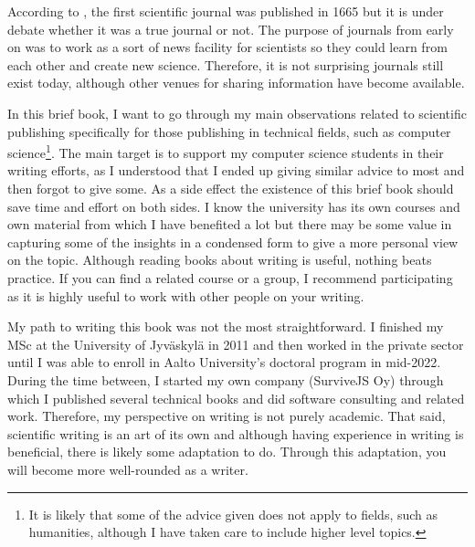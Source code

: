 


According to \citet{openWhatFirst}, the first scientific journal was published in 1665 but it is under debate whether it was a true journal or not.
The purpose of journals from early on was to work as a sort of news facility for scientists so they could learn from each other and create new science.
Therefore, it is not surprising journals still exist today, although other venues for sharing information have become available.

In this brief book, I want to go through my main observations related to scientific publishing specifically for those publishing in technical fields, such as computer science\footnote{It is likely that some of the advice given does not apply to fields, such as humanities, although I have taken care to include higher level topics.}.
The main target is to support my computer science students in their writing efforts, as I understood that I ended up giving similar advice to most and then forgot to give some.
As a side effect the existence of this brief book should save time and effort on both sides.
I know the university has its own courses and own material from which I have benefited a lot but there may be some value in capturing some of the insights in a condensed form to give a more personal view on the topic.
Although reading books about writing is useful, nothing beats practice.
If you can find a related course or a group, I recommend participating as it is highly useful to work with other people on your writing.

My path to writing this book was not the most straightforward.
I finished my MSc at the University of Jyväskylä in 2011 and then worked in the private sector until I was able to enroll in Aalto University's doctoral program in mid-2022.
During the time between, I started my own company (SurviveJS Oy) through which I published several technical books and did software consulting and related work. 
Therefore, my perspective on writing is not purely academic.
That said, scientific writing is an art of its own and although having experience in writing is beneficial, there is likely some adaptation to do.
Through this adaptation, you will become more well-rounded as a writer.


